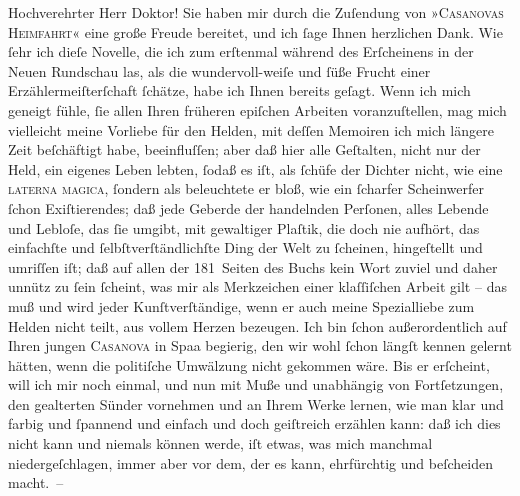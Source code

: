 \pstart\center{}Hochverehrter Herr Doktor!\pend\vspace{0.5em}
\pstart
           Sie haben mir durch die Zuſendung von »\textsc{Casanovas Heimfahrt}« eine große Freude bereitet, und ich ſage Ihnen herzlichen Dank. Wie ſehr ich
               dieſe Novelle, die ich zum
               erſtenmal während des Erſcheinens in der Neuen
                  Rundschau las, als die wundervoll-weiſe und ſüße Frucht einer
               Erzählermeiſterſchaft ſchätze, habe ich Ihnen bereits geſagt. Wenn ich mich geneigt
               fühle, ſie allen Ihren früheren epiſchen Arbeiten voranzuſtellen, mag mich vielleicht
               meine Vorliebe für den Helden, mit deſſen Memoiren ich mich längere Zeit beſchäftigt
               habe, beeinfluſſen; aber daß hier alle Geſtalten, nicht nur der Held, ein eigenes
               Leben lebten, ſodaß es iſt, als ſchüfe der Dichter nicht, wie eine \textsc{laterna magica}, ſondern als beleuchtete er bloß, wie ein
               ſcharfer Scheinwerfer ſchon Exiſtierendes; daß jede Geberde der handelnden Perſonen,
               alles {\pb}Lebende und Lebloſe, das ſie
               umgibt, mit gewaltiger Plaſtik, die doch nie aufhört, das einfachſte und
               ſelbſtverſtändlichſte Ding der Welt zu ſcheinen, hingeſtellt und umriſſen iſt; daß
               auf allen der 181 Seiten des Buchs kein Wort zuviel und daher unnütz zu ſein ſcheint, was mir als
               Merkzeichen einer klaſſiſchen Arbeit gilt – das muß und wird jeder Kunſtverſtändige,
               wenn er auch meine Spezialliebe zum Helden nicht teilt, aus vollem Herzen bezeugen.
               Ich bin ſchon außerordentlich auf Ihren jungen \textsc{Casanova} in Spaa begierig, den wir wohl ſchon längſt kennen gelernt hätten, wenn die politiſche
               Umwälzung nicht gekommen wäre. Bis er erſcheint, will ich mir noch einmal, und nun
               mit Muße und unabhängig von Fortſetzungen, den gealterten Sünder vornehmen und an
               Ihrem Werke lernen, wie man klar und farbig und ſpannend und einfach und doch
               geiſtreich erzählen kann: daß ich dies nicht kann und niemals können werde, iſt
               etwas, was mich manchmal niedergeſchlagen, immer aber vor dem, der es kann,
               ehrfürchtig und beſcheiden {\pb}macht. –\pend
           
